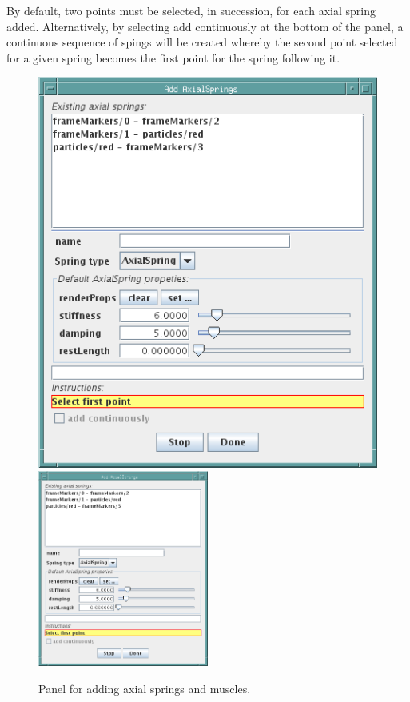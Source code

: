 \documentclass{article}
\begin{document}
By default, two points must be selected, in succession, for each axial
spring added. Alternatively, by selecting {\sf add continuously} at the
bottom of the panel, a continuous sequence of spings will be created
whereby the second point selected for a given spring becomes the first
point for the spring following it.

\begin{figure}
\begin{center}
\iflatexml
\includegraphics[]{images/addAxialSpringsPanel}
\else
\includegraphics[width=0.50\textwidth]{images/addAxialSpringsPanel}
\fi
\end{center}
\caption{Panel for adding axial springs and muscles.}%
\label{addAxialSpringsPanelFig}
\end{figure}
\end{document}
